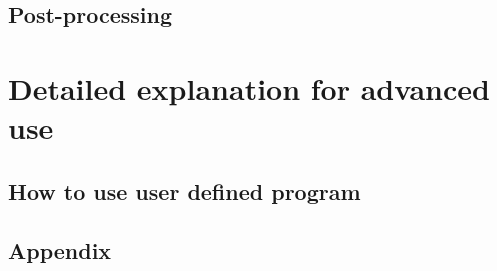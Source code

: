 \documentclass[a4paper]{report}
\begin{document}
 \chapter{Post-processing} \label{sec:basic_usel_post}
%  

\part{Detailed explanation for advanced use} \label{part:advance_use}
%  

 \chapter{How to use user defined program}
%  
%  
%  

%  




\begin{appendix}
\part{Appendix}
% 
% 
\end{appendix}


\ClearWallPaper

\end{document}
